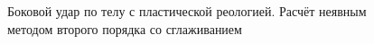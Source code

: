 \begin{figure}
\begin{minipage}[h]{0.47\linewidth}
 \\
\end{minipage}
\hfill
\begin{minipage}[h]{0.47\linewidth}
 \\
\end{minipage}
\caption{Боковой удар по телу с пластической реологией. Расчёт неявным методом второго порядка со сглаживанием}
\label{pic:implicit}
\end{figure}


